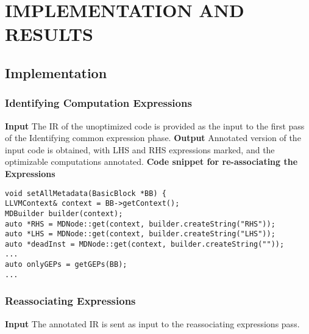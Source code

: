 
\chapter{IMPLEMENTATION AND RESULTS} %

\section{Implementation}
\subsection{Identifying Computation Expressions}
\noindent
\textbf{Input}
The IR of the unoptimized code is provided as the input to the first pass of the Identifying common expression phase.\newline
\hspace{35pt}\textbf{ Output}
Annotated version of the input code is obtained, with LHS and RHS expressions marked, and the optimizable computations annotated.\newline
\textbf{Code snippet for re-associating the Expressions}

\begin{lstlisting}
void setAllMetadata(BasicBlock *BB) {
LLVMContext& context = BB->getContext();
MDBuilder builder(context);
auto *RHS = MDNode::get(context, builder.createString("RHS"));
auto *LHS = MDNode::get(context, builder.createString("LHS"));
auto *deadInst = MDNode::get(context, builder.createString(""));
...
auto onlyGEPs = getGEPs(BB);
...
\end{lstlisting}
\newpage

\subsection{Reassociating Expressions}
\noindent
\textbf{Input}\newline
The annotated IR is sent as input to the reassociating expressions pass.

